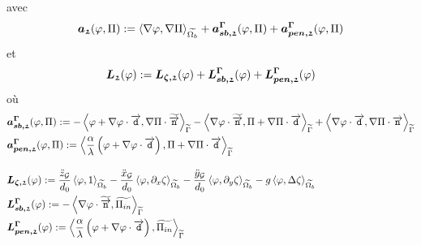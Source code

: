 avec
\begin{equation}
	\boldsymbol{a_{\mathfrak{2}}}(\varphi, \Pi) := \left<\nabla \varphi,\nabla \Pi\right>_{\widetilde{\Omega_b}} + \boldsymbol{a_{sb, \mathfrak{2}}^{\Gamma}} (\varphi, \Pi) + \boldsymbol{a_{pen, \mathfrak{2}}^{\Gamma}} (\varphi, \Pi)\label{eq:a_2}\\
\end{equation}
et 
\begin{equation}
	\boldsymbol{L_{\mathfrak{2}}}(\varphi) := \boldsymbol{L_{\zeta, \mathfrak{2}}} (\varphi)  + \boldsymbol{L_{sb, \mathfrak{2}}^{\Gamma}}(\varphi) + \boldsymbol{L_{pen, \mathfrak{2}}^{\Gamma}}(\varphi)\label{eq:L_2}
\end{equation}
où 
\begin{subequations}
\begin{align}
	&\boldsymbol{a_{sb, \mathfrak{2}}^{\Gamma} } (\varphi, \Pi) := -\left<\varphi + \nabla \varphi \cdot \overrightarrow{\boldsymbol{\mathtt{d}}},\nabla \Pi \cdot \widetilde{\overrightarrow{\boldsymbol{\mathtt{n}}}}\right>_{\widetilde{\Gamma}} - \left<\nabla \varphi \cdot \widetilde{\overrightarrow{\boldsymbol{\mathtt{n}}}},\Pi + \nabla \Pi \cdot \overrightarrow{\boldsymbol{\mathtt{d}}}\right>_{\widetilde{\Gamma}} + \left<\nabla \varphi \cdot \overrightarrow{\boldsymbol{\mathtt{d}}},\nabla \Pi \cdot \overrightarrow{\boldsymbol{\mathtt{n}}}\right>_{\widetilde{\Gamma}}\label{eq:a_sb_2}\\
	&\boldsymbol{a_{pen, \mathfrak{2}}^{\Gamma}} (\varphi, \Pi) := \left<\frac{\alpha}{\lambda} \left(\varphi + \nabla \varphi \cdot \overrightarrow{\boldsymbol{\mathtt{d}}}\right),\Pi + \nabla \Pi \cdot \overrightarrow{\boldsymbol{\mathtt{d}}}\right>_{\widetilde{\Gamma}}\label{eq:a_pen_2}\\[1em]
	&\boldsymbol{L_{\zeta, \mathfrak{2}}}(\varphi) := \frac{\ddot{z}_\mathcal{G}}{d_0}\left<\varphi,1\right>_{\widetilde{\Omega_b}} - \frac{\ddot{x}_\mathcal{G}}{d_0}\left<\varphi,\partial_x \zeta\right>_{\widetilde{\Omega_b}} - \frac{\ddot{y}_\mathcal{G} }{d_0}\left<\varphi,\partial_y \zeta\right>_{\widetilde{\Omega_b}} - g\left<\varphi, \Delta \zeta\right>_{\widetilde{\Omega_b}}\label{eq:L_zeta_2}\\
	&\boldsymbol{L_{sb, \mathfrak{2}}^{\Gamma}}(\varphi) := -\left<\nabla \varphi \cdot \widetilde{\overrightarrow{\boldsymbol{\mathtt{n}}}},\widetilde{\Pi_{in}}\right>_{\widetilde{\Gamma}}\label{eq:L_sb_2}\\
	&\boldsymbol{L_{pen, \mathfrak{2}}^{\Gamma}}(\varphi) :=  \left<\frac{\alpha}{\lambda} \left(\varphi + \nabla \varphi \cdot \overrightarrow{\boldsymbol{\mathtt{d}}}\right), \widetilde{\Pi_{in}}\right>_{\widetilde{\Gamma}}\label{eq:L_pen_2}
\end{align}
\end{subequations}










